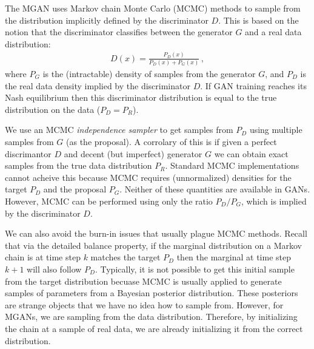 \documentclass{article}
\begin{document}
The MGAN uses Markov chain Monte Carlo (MCMC) methods to sample from the distribution implicitly defined by the discriminator $D$.
This is based on the notion that the discriminator classifies between the generator $G$ and a real data distribution:
\begin{align}
  D(x) = \frac{P_D(x)}{P_D(x) + P_G(x)}\,,
\end{align}
where $P_G$ is the (intractable) density of samples from the generator $G$, and $P_D$ is the real data density implied by the discriminator $D$.
If GAN training reaches its Nash equilibrium then this discriminator distribution is equal to the true distribution on the data ($P_D = P_R$)\@.  %

We use an MCMC \emph{independence sampler} to get samples from $P_D$ using multiple samples from $G$ (as the proposal)\@.
A corrolary of this is if given a perfect discrimantor $D$ and decent (but imperfect) generator $G$ we can obtain exact samples from the true data distribution $P_R$.
Standard MCMC implementations cannot acheive this because MCMC requires (unnormalized) densities for the target $P_D$ and the proposal $P_G$.
Neither of these quantities are available in GANs.
However, MCMC can be performed using only the ratio $P_D / P_G$, which is implied by the discriminator $D$.

We can also avoid the burn-in issues that usually plague MCMC methods.
Recall that via the detailed balance property, if the marginal distribution on a Markov chain is at time step $k$ matches the target $P_D$ then the marginal at time step $k+1$ will also follow $P_D$.
Typically, it is not possible to get this initial sample from the target distribution becuase MCMC is usually applied to generate samples of parameters from a Bayesian posterior distribution.
These posteriors are strange objects that we have no idea how to sample from.
However, for MGANs, we are sampling from the data distribution.
Therefore, by initializing the chain at a sample of real data, we are already initializing it from the correct distribution.
\end{document}
